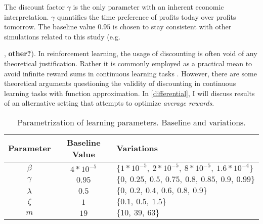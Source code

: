 The discount factor $\gamma$ is the only parameter with an inherent economic interpretation. $\gamma$ quantifies the time preference of profits today over profits tomorrow. The baseline value $0.95$ is chosen to stay consistent with other simulations related to this study (e.g.\ {\textcite{calvano_artificial_2020}, \textcite{klein_autonomous_2019} \textbf{other?}). In reinforcement learning, the usage of discounting is often void of any theoretical justification. Rather it is commonly employed as a practical mean to avoid infinite reward sums in continuous learning tasks \parencite{schwartz_reinforcement_1993}. However, there are some theoretical arguments questioning the validity of discounting in continuous learning tasks with function approximation. In \autoref{differential}, I will discuss results of an alternative setting that attempts to optimize \emph{average rewards}.

\begin{center}
	\begin{table}
		\begin{tabular}{|c|c|l|}
			\hline
			\textbf{Parameter}&\textbf{Baseline Value}&\textbf{Variations}\\
			\hline
			$\beta$&$4 * 10^{-5}$&$\{1 * 10^{-5}, ~2 * 10^{-5}, ~8 * 10^{-5}, ~1.6 * 10^{-4}\}$ \\
			\hline
			$\gamma$&$0.95$&$\{0, ~0.25, ~0.5, ~0.75, ~0.8, ~0.85, ~0.9, ~0.99\}$ \\
			\hline
			$\lambda$&$0.5$&$\{0, ~0.2, ~0.4, ~0.6, ~0.8, ~0.9\}$ \\
			\hline
			$\zeta$&$1$&$\{0.1, ~0.5, ~1.5\}$ \\
			\hline
			$m$&$19$&$\{10, ~39, ~63\}$ \\
			\hline
		\end{tabular}
		\caption{Parametrization of learning parameters. Baseline and variations.}
		\label{baseline}
	\end{table}
\end{center}

}

